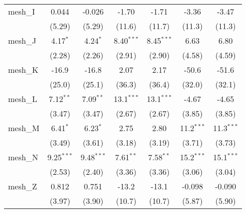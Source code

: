 \begin{tabular}{lcccccc}
   mesh\_I                                                     & 0.044          & -0.026        & -1.70         & -1.71         & -3.36         & -3.47\\   
                                                               & (5.29)         & (5.29)        & (11.6)        & (11.7)        & (11.3)        & (11.3)\\   
   mesh\_J                                                     & 4.17$^{*}$     & 4.24$^{*}$    & 8.40$^{***}$  & 8.45$^{***}$  & 6.63          & 6.80\\   
                                                               & (2.28)         & (2.26)        & (2.91)        & (2.90)        & (4.58)        & (4.59)\\   
   mesh\_K                                                     & -16.9          & -16.8         & 2.07          & 2.17          & -50.6         & -51.6\\   
                                                               & (25.0)         & (25.1)        & (36.3)        & (36.4)        & (32.0)        & (32.1)\\   
   mesh\_L                                                     & 7.12$^{**}$    & 7.09$^{**}$   & 13.1$^{***}$  & 13.1$^{***}$  & -4.67         & -4.65\\   
                                                               & (3.47)         & (3.47)        & (2.67)        & (2.67)        & (3.85)        & (3.85)\\   
   mesh\_M                                                     & 6.41$^{*}$     & 6.23$^{*}$    & 2.75          & 2.80          & 11.2$^{***}$  & 11.3$^{***}$\\   
                                                               & (3.49)         & (3.61)        & (3.18)        & (3.19)        & (3.71)        & (3.73)\\   
   mesh\_N                                                     & 9.25$^{***}$   & 9.48$^{***}$  & 7.61$^{**}$   & 7.58$^{**}$   & 15.2$^{***}$  & 15.1$^{***}$\\   
                                                               & (2.53)         & (2.40)        & (3.36)        & (3.36)        & (3.06)        & (3.04)\\   
   mesh\_Z                                                     & 0.812          & 0.751         & -13.2         & -13.1         & -0.098        & -0.090\\   
                                                               & (3.97)         & (3.90)        & (10.7)        & (10.7)        & (5.87)        & (5.90)\\   

\end{tabular}
